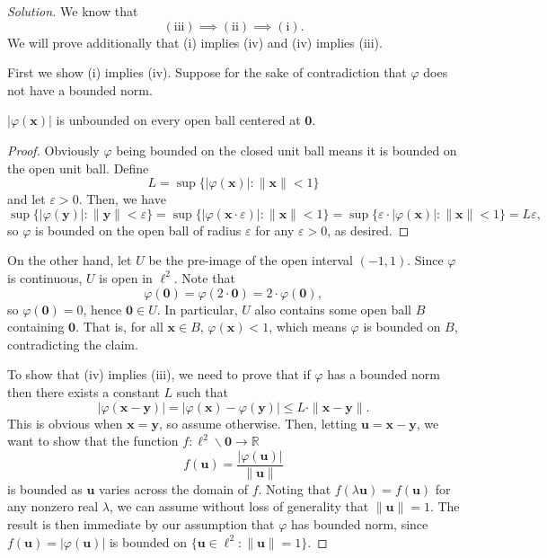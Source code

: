 \documentclass[11pt]{scrartcl}
\providecommand{\eps}{\varepsilon}
\providecommand{\RR}{\mathbb R}
\providecommand{\setdiff}{\smallsetminus}
\providecommand{\mb}[1]{\mathbf{#1}}
\newenvironment{soln}{\begin{proof}[Solution]}{\end{proof}}
\begin{document}
\begin{soln}
	We know that
	\[\mathrm{(iii)}\implies \mathrm{(ii)}\implies \mathrm{(i)}.\]
	We will prove additionally that (i) implies (iv) and (iv) implies (iii).
	
	First we show (i) implies (iv).
	Suppose for the sake of contradiction that
	$\varphi$ does not have a bounded norm.
	
	\begin{claim}
		$|\varphi(\mb x)|$ is unbounded on every open ball centered at $\mb 0$.
	\end{claim}
	\begin{proof}
		Obviously $\varphi$ being bounded on the closed unit ball
		means it is bounded on the open unit ball. Define
		\[L = \sup\{|\varphi(\mb x)| : \|\mb x\| < 1\}\]
		and let $\eps > 0$. Then, we have
		\[\sup\{|\varphi(\mb y)| : \|\mb y\| < \eps\}
		= \sup\{|\varphi(\mb x\cdot\eps)| : \|\mb x\| < 1\}
		= \sup\{\eps\cdot |\varphi(\mb x)| : \|\mb x\| < 1\}
		= L\eps,\]
		so $\varphi$ is bounded on the open ball of radius $\eps$
		for any $\eps > 0$, as desired.
	\end{proof}

	On the other hand, let $U$ be the pre-image of the open interval $(-1,1)$.
	Since $\varphi$ is continuous, $U$ is open in $\ell^2$. Note that
	\[\varphi(\mb 0) = \varphi(2\cdot\mb 0) = 2\cdot\varphi(\mb 0),\]
	so $\varphi(\mb 0) = 0$, hence $\mb 0\in U$. In particular,
	$U$ also contains some open ball $B$ containing $\mb 0$.
	That is, for all $\mb x\in B$, $\varphi(\mb x) < 1$,
	which means $\varphi$ is bounded on $B$, contradicting the claim.
	
	To show that (iv) implies (iii), we need to prove that
	if $\varphi$ has a bounded norm then there exists a constant $L$ such that
	\[|\varphi(\mb x - \mb y)| =
	|\varphi(\mb x) - \varphi(\mb y)| \le L\cdot\|\mb x - \mb y\|.\]
	This is obvious when $\mb x = \mb y$, so assume otherwise.
	Then, letting $\mb u = \mb x - \mb y$, we want to show that
	the function $f\colon\ell^2\setdiff \mb 0\to \RR$
	\[f(\mb u) = \frac{|\varphi(\mb u)|}{\|\mb u\|}\]
	is bounded as $\mb u$ varies across the domain of $f$.
	Noting that $f(\lambda\mb u) = f(\mb u)$ for any nonzero real $\lambda$,
	we can assume without loss of generality that $\|\mb u\| = 1$.
	The result is then immediate by our assumption that
	$\varphi$ has bounded norm, since
	$f(\mb u) = |\varphi(\mb u)|$ is bounded on
	$\{\mb u\in\ell^2 : \|\mb u\|=1\}.$
\end{soln}
\end{document}
